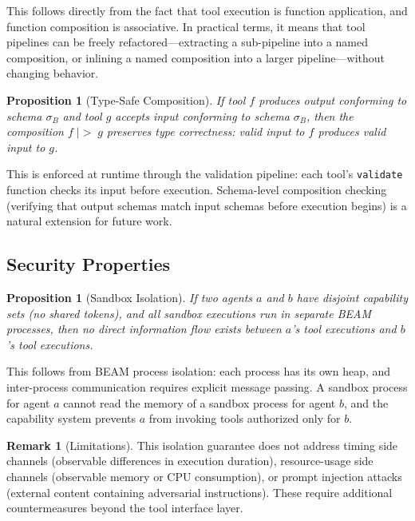 \documentclass[12pt,a4paper]{article}
\theoremstyle{plain}
\newtheorem{proposition}[theorem]{Proposition}
\theoremstyle{definition}
\newtheorem{remark}[theorem]{Remark}
\newcommand{\pipe}{\;|\!\!>\;}
\begin{document}
This follows directly from the fact that tool execution is function application, and function composition is associative. In practical terms, it means that tool pipelines can be freely refactored---extracting a sub-pipeline into a named composition, or inlining a named composition into a larger pipeline---without changing behavior.

\begin{proposition}[Type-Safe Composition]
If tool $f$ produces output conforming to schema $\sigma_B$ and tool $g$ accepts input conforming to schema $\sigma_B$, then the composition $f \pipe g$ preserves type correctness: valid input to $f$ produces valid input to $g$.
\end{proposition}

This is enforced at runtime through the validation pipeline: each tool's \texttt{validate} function checks its input before execution. Schema-level composition checking (verifying that output schemas match input schemas before execution begins) is a natural extension for future work.

\subsection{Security Properties}

\begin{proposition}[Sandbox Isolation]
If two agents $a$ and $b$ have disjoint capability sets (no shared tokens), and all sandbox executions run in separate BEAM processes, then no direct information flow exists between $a$'s tool executions and $b$'s tool executions.
\end{proposition}

This follows from BEAM process isolation: each process has its own heap, and inter-process communication requires explicit message passing. A sandbox process for agent $a$ cannot read the memory of a sandbox process for agent $b$, and the capability system prevents $a$ from invoking tools authorized only for $b$.

\begin{remark}[Limitations]
This isolation guarantee does not address timing side channels (observable differences in execution duration), resource-usage side channels (observable memory or CPU consumption), or prompt injection attacks (external content containing adversarial instructions). These require additional countermeasures beyond the tool interface layer.
\end{remark}
\end{document}
